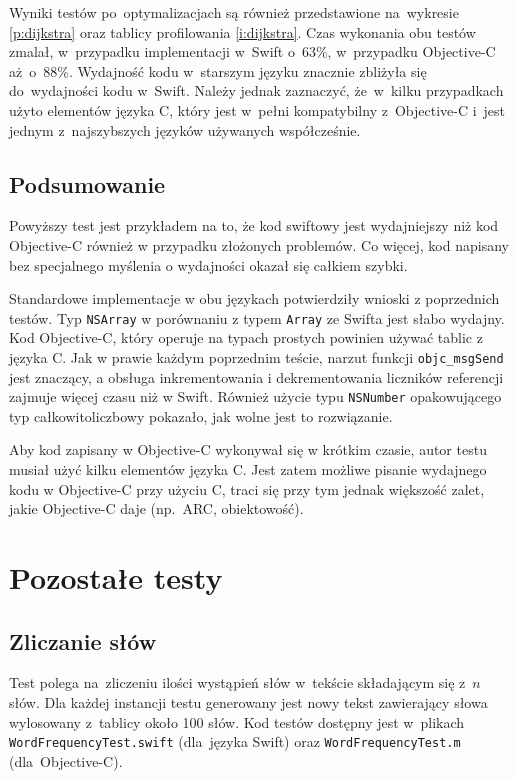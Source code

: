\documentclass[mgr, shortabstract]{iithesis}
\newcommand{\swiftinline}[1]{
    \texttt{#1}
}
\newcommand{\objcinline}[1]{
    \texttt{#1}
}
\begin{document}
Wyniki testów po~optymalizacjach są również przedstawione na~wykresie \ref{p:dijkstra} oraz tablicy profilowania \ref{i:dijkstra}. Czas wykonania obu testów zmalał, w~przypadku implementacji w~Swift o~$63\%$, w~przypadku Objective-C aż~o~$88\%$. Wydajność kodu w~starszym języku znacznie zbliżyła się do~wydajności kodu w~Swift. Należy jednak zaznaczyć, że~w~kilku przypadkach użyto elementów języka C, który jest w~pełni kompatybilny z~Objective-C i~jest jednym z~najszybszych języków używanych współcześnie.

\subsection{Podsumowanie}

Powyższy test jest przykładem na to, że kod swiftowy jest wydajniejszy niż kod Objective-C również w przypadku złożonych problemów. Co więcej, kod napisany bez specjalnego myślenia o wydajności okazał się całkiem szybki.

Standardowe implementacje w obu językach potwierdziły wnioski z poprzednich testów. Typ \objcinline{NSArray} w porównaniu z typem \swiftinline{Array} ze Swifta jest słabo wydajny. Kod Objective-C, który operuje na typach prostych powinien używać tablic z języka C. Jak w prawie każdym poprzednim teście, narzut funkcji \swiftinline{objc_msgSend} jest znaczący, a obsługa inkrementowania i dekrementowania liczników referencji zajmuje więcej czasu niż w Swift. Również użycie typu \objcinline{NSNumber} opakowującego typ całkowitoliczbowy pokazało, jak wolne jest to rozwiązanie.

Aby kod zapisany w Objective-C wykonywał się w krótkim czasie, autor testu musiał użyć kilku elementów języka C. Jest zatem możliwe pisanie wydajnego kodu w Objective-C przy użyciu C, traci się przy tym jednak większość zalet, jakie Objective-C daje (np.~ARC, obiektowość).

\section{Pozostałe testy}

\subsection{Zliczanie słów}

Test polega na~zliczeniu ilości wystąpień słów w~tekście składającym się z~$n$ słów. Dla każdej instancji testu generowany jest nowy tekst zawierający słowa wylosowany z~tablicy około 100 słów. Kod testów dostępny jest w~plikach \texttt{WordFrequencyTest.swift} (dla~języka Swift) oraz \texttt{WordFrequencyTest.m} (dla~Objective-C).
\end{document}

